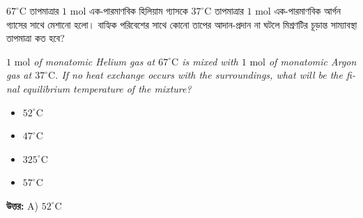 \documentclass[12pt, a4paper]{article}
\begin{document}
\begin{tcolorbox}[questionbox={প্রশ্ন (Question) 19}]
    \noindent
    $67^\circ\text{C}$ তাপমাত্রার $1\text{ mol}$ এক-পারমাণবিক হিলিয়াম গ্যাসকে $37^\circ\text{C}$ তাপমাত্রার $1\text{ mol}$ এক-পারমাণবিক আর্গন গ্যাসের সাথে মেশানো হলো। বাহ্যিক পরিবেশের সাথে কোনো তাপের আদান-প্রদান না ঘটলে মিশ্রণটির চূড়ান্ত সাম্যাবস্থা তাপমাত্রা কত হবে?
    
    \vspace{0.8em}
    \begin{english}
    \noindent\textit{\color{darkgray}
    $1\text{ mol}$ of monatomic Helium gas at $67^\circ\text{C}$ is mixed with $1\text{ mol}$ of monatomic Argon gas at $37^\circ\text{C}$. If no heat exchange occurs with the surroundings, what will be the final equilibrium temperature of the mixture?
    }
    \end{english}
\end{tcolorbox}

\begin{itemize}[label={}, leftmargin=1cm, itemsep=0.5em]
    \item[\textbf{A)}] $52^\circ\text{C}$
    \item[\textbf{B)}] $47^\circ\text{C}$
    \item[\textbf{C)}] $325^\circ\text{C}$
    \item[\textbf{D)}] $57^\circ\text{C}$
\end{itemize}

\vspace{0.5em}
\begin{tcolorbox}[answerbox]
    \textbf{\color{success} উত্তর:} A) $52^\circ\text{C}$
\end{tcolorbox}
\vspace{1em}
\end{document}
